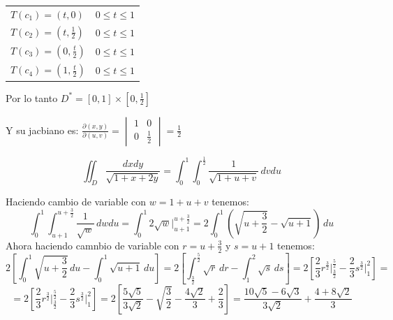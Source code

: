 \documentclass[10pt,letterpaper,fleqn]{article}
\begin{document}
\begin{enumerate}
            \begin{tabular}{ll}
                $T(c_1) = (t,0)$ & $0 \leq t \leq 1$ \\
                $T(c_2) = (t,\frac{1}{2})$ & $0 \leq t \leq 1$ \\
                $T(c_3) = (0,\frac{t}{2})$ & $0 \leq t \leq 1$ \\
                $T(c_4) = (1,\frac{t}{2})$ & $0 \leq t \leq 1$ \\
            \end{tabular}

            \vspace{0.3cm}
            Por lo tanto $D^*= [0,1] \times [0,\frac{1}{2}]$ 
            
            \vspace{0.3cm}
            Y su jacbiano es: $\frac{\partial (x,y)}{\partial (u,v)}= 
            \begin{vmatrix}
                1 & 0 \\
                0 & \frac{1}{2}
            \end{vmatrix}
            = \frac{1}{2}$
            
            \vspace{0.5cm}
            $$\iint_D{\frac{dxdy}{\sqrt{1+x+2y}}} = 
            \int_0^1\int_0^\frac{1}{2} \frac{1}{\sqrt{1+u+v}}\,dvdu$$

            Haciendo cambio de variable con $w=1+u+v$ tenemos: \\
            $$\int_0^1\int_{u+1}^{u+\frac{3}{2}} \frac{1}{\sqrt{w}}\,dwdu = 
            \int_0^1 2 \sqrt{w} \big|_{u+1}^{u+\frac{3}{2}} = 
            2\int_0^1\left(\sqrt{u+\frac{3}{2}} - \sqrt{u+1}\right)\,du$$
            Ahora haciendo camnbio de variable con $r = u + \frac{3}{2}$ y $s=u+1$ tenemos:
            $$2\left[\int_0^1\sqrt{u+\frac{3}{2}}\,du - \int_0^1 \sqrt{u+1}\,du\right] =
            2\left[\int_{\frac{3}{2}}^{\frac{5}{2}}\sqrt{r}\,dr - \int_1^2 \sqrt{s}\,ds\right] =
            2\left[\frac{2}{3}r^{\frac{3}{2}} \big|_\frac{3}{2}^\frac{5}{2} - \frac{2}{3}s^{\frac{3}{2}}\big|_1^2\right] = $$
            $$=2\left[\frac{2}{3}r^{\frac{3}{2}} \big|_\frac{3}{2}^\frac{5}{2} - \frac{2}{3}s^{\frac{3}{2}}\big|_1^2\right] = 
            2\left[\frac{5\sqrt{5}}{3\sqrt{2}} - \sqrt{\frac{3}{2}} - \frac{4\sqrt{2}}{3} + \frac{2}{3} \right] =
            \frac{10\sqrt{5} - 6\sqrt{3}}{3\sqrt{2}} + \frac{4 + 8\sqrt{2}}{3} $$


\end{enumerate}
\end{document}
